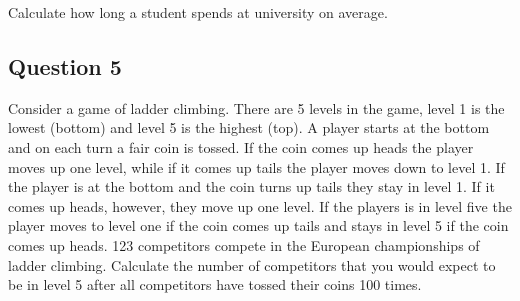 \documentclass[a4paper]{article}
\begin{document}
\noindent Calculate how long a student spends at university on average. 

\subsection{Question 5}

Consider a game of ladder climbing.  There are 5 levels in the game, level 1 is the lowest (bottom) and level 5 is the highest (top).  A player starts at the bottom and on each turn a 
fair coin is tossed.  If the coin comes up heads the player moves up one level, while if it comes up tails the player moves down to level 1.  If the player is at the bottom and the coin turns up 
tails they stay in level 1.  If it comes up heads, however, they move up one level.  If the players is in level five the player moves to level one if the coin comes up tails and stays in level 5 
if the coin comes up heads.  123 competitors compete in the European championships of ladder climbing.  Calculate the number of competitors that you would expect to be in level 5 after all 
competitors have tossed their coins 100 times.
\end{document}
